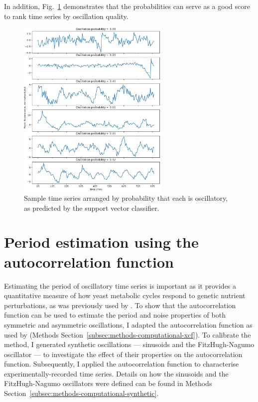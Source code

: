 In addition, Fig.\ \ref{fig:analysis-svc-proba-gallery} demonstrates that the probabilities can serve as a good score to rank time series by oscillation quality.

\begin{figure}[h!]
  \centering
  \includegraphics[width=0.65\textwidth]{svm_3_edit.pdf}

  \caption{
    Sample time series arranged by probability that each is oscillatory, as predicted by the support vector classifier.
  }
  \label{fig:analysis-svc-proba-gallery}
\end{figure}


\section{Period estimation using the autocorrelation function}
\label{sec:analysis-characterisation}

Estimating the period of oscillatory time series is important as it provides a quantitative measure of how yeast metabolic cycles respond to genetic nutrient perturbations, as was previously used by \textcite{papagiannakisAutonomousMetabolicOscillations2017}.
To show that the autocorrelation function can be used to estimate the period and noise properties of both symmetric and asymmetric oscillations, I adapted the autocorrelation function as used by \textcite{pietschDeterminingGrowthRates2023} (Methods Section~\ref{subsec:methods-computational-xcf}).
To calibrate the method, I generated synthetic oscillations --- sinusoids and the FitzHugh-Nagumo oscillator \parencite{fitzhughImpulsesPhysiologicalStates1961} --- to investigate the effect of their properties on the autocorrelation function.
Subsequently, I applied the autocorrelation function to characterise experimentally-recorded time series.
Details on how the sinusoids and the FitzHugh-Nagumo oscillators were defined can be found in Methods Section~\ref{subsec:methods-computational-synthetic}.

